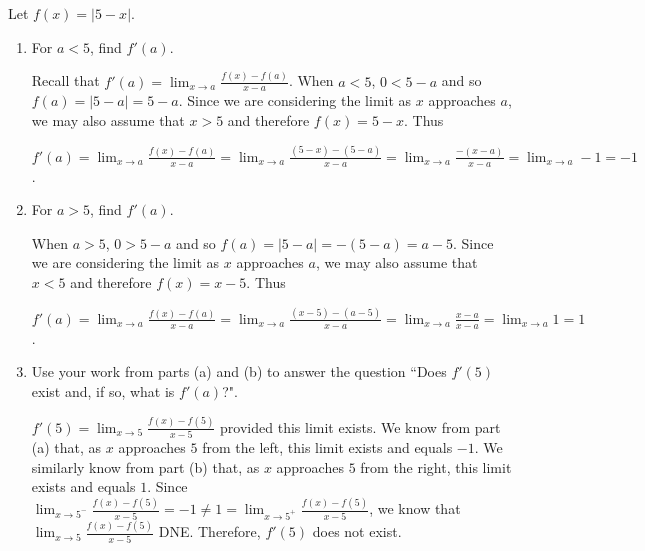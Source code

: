 \documentclass[handout,nooutcomes]{ximera}
\begin{document}
\begin{problem}
Let $f(x) = |5-x|$.
	
	\begin{enumerate}
	
	\item For $a < 5$, find $f'(a)$.
	
		\begin{freeResponse}
		Recall that $f'(a) = \lim_{x \to a} \frac{f(x) - f(a)}{x-a}$.  When $a < 5$, $0 < 5-a$ and so $f(a) = |5-a| = 5-a$.  Since we are considering the limit as $x$ approaches $a$, we may also assume that $x > 5$ and therefore $f(x) = 5-x$.  Thus
		
		$f'(a) = \lim_{x \to a} \frac{f(x) - f(a)}{x-a}
		= \lim_{x \to a} \frac{(5-x) - (5-a)}{x-a}
		= \lim_{x \to a} \frac{-(x-a)}{x-a}
		= \lim_{x \to a} -1 = -1$.
		\end{freeResponse}
		
		
	
	\item For $a > 5$, find $f'(a)$.
	
		\begin{freeResponse}
		When $a > 5$, $0 > 5-a$ and so $f(a) = |5-a| = -(5-a) = a-5$.  Since we are considering the limit as $x$ approaches $a$, we may also assume that $x < 5$ and therefore $f(x) = x-5$.  Thus
		
		$f'(a) = \lim_{x \to a} \frac{f(x) - f(a)}{x-a}
		= \lim_{x \to a} \frac{(x-5) - (a-5)}{x-a}
		= \lim_{x \to a} \frac{x-a}{x-a}
		= \lim_{x \to a} 1 = 1$.

		\end{freeResponse}
		
		
	
	\item Use your work from parts (a) and (b) to answer the question ``Does $f'(5)$ exist and, if so, what is $f'(a)$?".
	
		\begin{freeResponse}
		$f'(5) = \lim_{x \to 5} \frac{f(x) - f(5)}{x-5}$ provided this limit exists.  We know from part (a) that, as $x$ approaches $5$ from the left, this limit exists and equals $-1$.  We similarly know from part (b) that, as $x$ approaches $5$ from the right, this limit exists and equals $1$.  Since $\lim_{x \to 5^-} \frac{f(x) - f(5)}{x-5} = -1 \neq 1 = \lim_{x \to 5^+} \frac{f(x) - f(5)}{x-5}$, we know that $\lim_{x \to 5} \frac{f(x) - f(5)}{x-5}$ DNE.  Therefore, $f'(5)$ does not exist.
		\end{freeResponse}
		
		
	
	\end{enumerate}


\end{problem}
	
	
	
	
	
	
	
	
	

	










								
				
				
	
\end{document}
